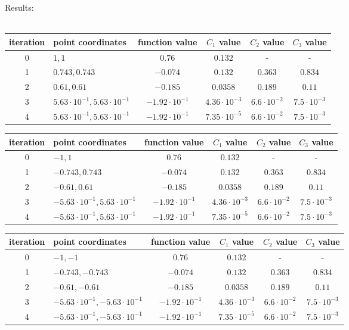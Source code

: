 \documentclass[12pt]{article}
\begin{document}
	\begin{table}[H]
		Results: \\ \\
		\begin{tabularx}{\textwidth}{c|X|c|c|c|c|}
			iteration & point coordinates & function value & $C_1$ value & $C_2$ value & $C_3$ value\\
			\hline
			0 & $1, 1$ & $0.76$ & $0.132$ & - & - \\
			\hline					
			1 & $0.743, 0.743$ & $-0.074$ & $0.132$ & $0.363$ & $0.834$ \\ 
			\hline 
			2 & $0.61, 0.61$ & $-0.185$ & $0.0358$ & $0.189$ & $0.11$ \\ 
			\hline
			3 & $5.63\cdot10^{-1}, 5.63\cdot10^{-1}$  & $-1.92\cdot10^{-1}$ & $4.36\cdot10^{-3}$ & $6.6\cdot10^{-2}$ & $7.5\cdot10^{-3}$ \\ 
			\hline
			4 & $5.63\cdot10^{-1}, 5.63\cdot10^{-1}$  & $-1.92\cdot10^{-1}$ &
			$7.35\cdot10^{-5}$ & $6.6\cdot10^{-2}$ & $7.5\cdot10^{-3}$ \\ \hline
		\end{tabularx}	
	\end{table}		
	\begin{table}[H]
		\begin{tabularx}{\textwidth}{c|X|c|c|c|c|}
			iteration & point coordinates & function value & $C_1$ value & $C_2$ value & $C_3$ value\\
			\hline	
			0 & $-1, 1$ & $0.76$ & $0.132$ & - & - \\
			\hline					
			1 & $-0.743, 0.743$ & $-0.074$ & $0.132$ & $0.363$ & $0.834$ \\ 
			\hline 
			2 & $-0.61, 0.61$ & $-0.185$ & $0.0358$ & $0.189$ & $0.11$ \\ 
			\hline
			3 & $-5.63\cdot10^{-1}, 5.63\cdot10^{-1}$  & $-1.92\cdot10^{-1}$ & $4.36\cdot10^{-3}$ & $6.6\cdot10^{-2}$ & $7.5\cdot10^{-3}$ \\ 
			\hline
			4 & $-5.63\cdot10^{-1}, 5.63\cdot10^{-1}$  & $-1.92\cdot10^{-1}$ &
			$7.35\cdot10^{-5}$ & $6.6\cdot10^{-2}$ & $7.5\cdot10^{-3}$ \\ \hline
		\end{tabularx}		 
	\end{table}
	\begin{table}[H]
		\begin{tabularx}{\textwidth}{c|X|c|c|c|c|}
			iteration & point coordinates & function value & $C_1$ value & $C_2$ value & $C_3$ value\\
			\hline	
			0 & $-1, -1$ & $0.76$ & $0.132$ & - & - \\
			\hline					
			1 & $-0.743, -0.743$ & $-0.074$ & $0.132$ & $0.363$ & $0.834$ \\ 
			\hline 
			2 & $-0.61, -0.61$ & $-0.185$ & $0.0358$ & $0.189$ & $0.11$ \\ 
			\hline
			3 & $-5.63\cdot10^{-1}, -5.63\cdot10^{-1}$  & $-1.92\cdot10^{-1}$ & $4.36\cdot10^{-3}$ & $6.6\cdot10^{-2}$ & $7.5\cdot10^{-3}$ \\ 
			\hline
			4 & $-5.63\cdot10^{-1}, -5.63\cdot10^{-1}$  & $-1.92\cdot10^{-1}$ &
			$7.35\cdot10^{-5}$ & $6.6\cdot10^{-2}$ & $7.5\cdot10^{-3}$ \\ \hline
		\end{tabularx}		 
	\end{table}
\end{document}
